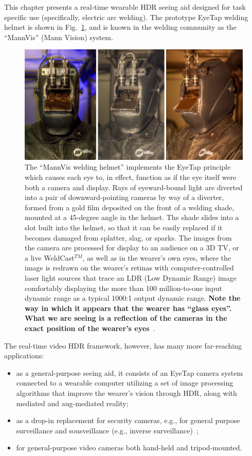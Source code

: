 This chapter presents a real-time wearable HDR seeing aid designed for task specific use 
(specifically, electric arc welding). The prototype EyeTap welding helmet is shown in 
Fig.~\ref{fig:mannvis}, and is known in the welding community as the ``MannVis'' (Mann Vision) 
system.
\begin{figure}[t]
  \includegraphics[width=15cm]{ch3/diagrams/cyborg_welding_helmet_2011_02_18_09_53_54_39004100_lowres.jpg}
 \caption{The ``MannVis welding helmet'' implements the EyeTap
   principle which causes each eye to, in effect, function as if the
   eye itself were both a camera and display.  Rays of eyeward-bound
   light are diverted into a pair of downward-pointing cameras by way
   of a diverter, formed from a gold film deposited on the front of a
   welding shade, mounted at a 45-degree angle in the helmet.  The
   shade slides into a slot built into the helmet, so that it can be
   easily replaced if it becomes damaged from splatter, slag, or
   sparks.  The images from the camera are processed for display to an
   audience on a 3D TV, or a live WeldCast$^{TM}$, as well as in the
   wearer's own eyes, where the image is redrawn on the wearer's
   retinas with computer-controlled laser light sources that trace an
   LDR (Low Dynamic Range) image comfortably displaying the more than
   100 million-to-one input dynamic range as a typical 1000:1 output
   dynamic range.  {\bf Note the way in which it appears that the
     wearer has ``glass eyes''.  What we are seeing is a reflection of
     the cameras in the exact position of the wearer's eyes}~\cite{mann2012realtime}. }
 \label{fig:mannvis}
\end{figure}

The real-time video HDR framework, however, has many more far-reaching
applications:
\begin{itemize}
\item as a general-purpose seeing aid, it consists of an EyeTap camera
  system connected to a wearable computer utilizing a set of image
  processing algorithms that improve the wearer's vision through HDR,
  along with mediated and aug-mediated reality;
\item as a drop-in replacement for security cameras, e.g., for general
  purpose surveillance and sousveillance (e.g., inverse surveillance)~\cite{mann2002sousveillance};
\item for general-purpose video cameras both hand-held and
  tripod-mounted.
\end{itemize}

